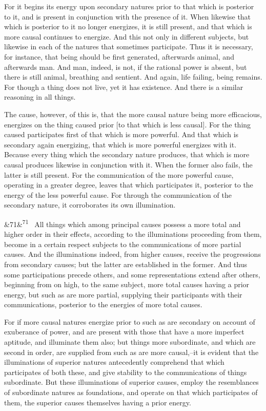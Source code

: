 \documentclass[12pt]{article}
\newcommand{\para}[1][]{\par\noindent\ifx&#1&\else\textsuperscript{\footnotesize #1}~\fi}
\begin{document}
For it begins its energy upon secondary natures prior to that which is posterior to it, and is present in conjunction with the presence of it. When likewise that which is posterior to it no longer energizes, it is still present, and that which is more causal continues to energize. And this not only in different subjects, but likewise in each of the natures that sometimes participate. Thus it is necessary, for instance, that being should be first generated, afterwards animal, and afterwards man. And man, indeed, is not, if the rational power is absent, but there is still animal, breathing and sentient. And again, life failing, being remains. For though a thing does not live, yet it has existence. And there is a similar reasoning in all things.

The cause, however, of this is, that the more causal nature being more efficacious, energizes on the thing caused prior [to that which is less causal]. For the thing caused participates first of that which is more powerful. And that which is secondary again energizing, that which is more powerful energizes with it. Because every thing which the secondary nature produces, that which is more causal produces likewise in conjunction with it. When the former also fails, the latter is still present. For the communication of the more powerful cause, operating in a greater degree, leaves that which participates it, posterior to the energy of the less powerful cause. For through the communication of the secondary nature, it corroborates its own illumination.

\para[71] All things which among principal causes possess a more total and higher order in their effects, according to the illuminations proceeding from them, become in a certain respect subjects to the communications of more partial causes. And the illuminations indeed, from higher causes, receive the progressions from secondary causes; but the latter are established in the former. And thus some participations precede others, and some representations extend after others, beginning from on high, to the same subject, more total causes having a prior energy, but such as are more partial, supplying their participants with their communications, posterior to the energies of more total causes.

For if more causal natures energize prior to such as are secondary on account of exuberance of power, and are present with those that have a more imperfect aptitude, and illuminate them also; but things more subordinate, and which are second in order, are supplied from such as are more causal,--it is evident that the illuminations of superior natures antecedently comprehend that which participates of both these, and give stability to the communications of things subordinate. But these illuminations of superior causes, employ the resemblances of subordinate natures as foundations, and operate on that which participates of them, the superior causes themselves having a prior energy.
\end{document}

